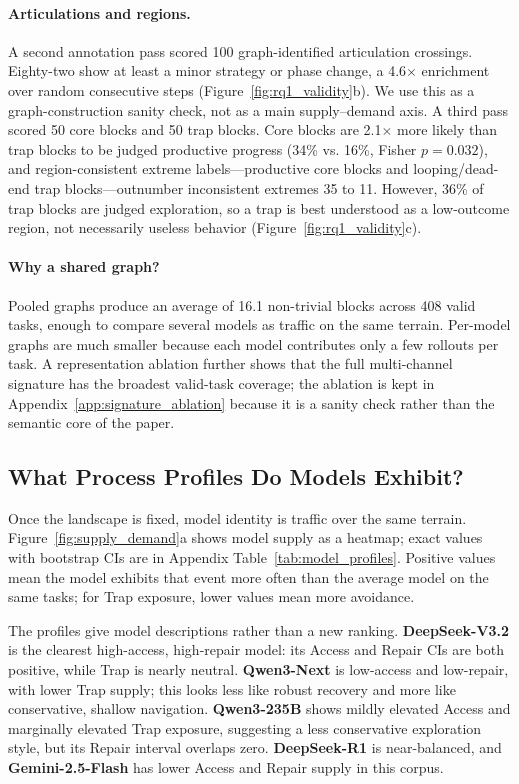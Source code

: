 \paragraph{Articulations and regions.}
A second annotation pass scored 100 graph-identified articulation crossings.
Eighty-two show at least a minor strategy or phase change, a 4.6$\times$ enrichment over random consecutive steps (Figure~\ref{fig:rq1_validity}b).
We use this as a graph-construction sanity check, not as a main supply--demand axis.
A third pass scored 50 core blocks and 50 trap blocks.
Core blocks are 2.1$\times$ more likely than trap blocks to be judged productive progress (34\% vs. 16\%, Fisher $p=0.032$), and region-consistent extreme labels---productive core blocks and looping/dead-end trap blocks---outnumber inconsistent extremes 35 to 11.
However, 36\% of trap blocks are judged exploration, so a trap is best understood as a low-outcome region, not necessarily useless behavior (Figure~\ref{fig:rq1_validity}c).

\paragraph{Why a shared graph?}
Pooled graphs produce an average of 16.1 non-trivial blocks across 408 valid tasks, enough to compare several models as traffic on the same terrain.
Per-model graphs are much smaller because each model contributes only a few rollouts per task.
A representation ablation further shows that the full multi-channel signature has the broadest valid-task coverage; the ablation is kept in Appendix~\ref{app:signature_ablation} because it is a sanity check rather than the semantic core of the paper.

\subsection{What Process Profiles Do Models Exhibit?}
\label{sec:rq2}

Once the landscape is fixed, model identity is traffic over the same terrain.
Figure~\ref{fig:supply_demand}a shows model supply as a heatmap; exact values with bootstrap CIs are in Appendix Table~\ref{tab:model_profiles}.
Positive values mean the model exhibits that event more often than the average model on the same tasks; for Trap exposure, lower values mean more avoidance.

The profiles give model descriptions rather than a new ranking.
\textbf{DeepSeek-V3.2} is the clearest high-access, high-repair model: its Access and Repair CIs are both positive, while Trap is nearly neutral.
\textbf{Qwen3-Next} is low-access and low-repair, with lower Trap supply; this looks less like robust recovery and more like conservative, shallow navigation.
\textbf{Qwen3-235B} shows mildly elevated Access and marginally elevated Trap exposure, suggesting a less conservative exploration style, but its Repair interval overlaps zero.
\textbf{DeepSeek-R1} is near-balanced, and \textbf{Gemini-2.5-Flash} has lower Access and Repair supply in this corpus.

